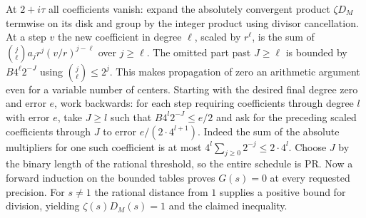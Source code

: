 At $2+i\tau$ all coefficients vanish: expand the absolutely convergent
product $\zeta D_M$ termwise on its disk and group by the integer product
using divisor cancellation. At a step $v$ the new coefficient in
degree $\ell$, scaled by $r^\ell$, is the sum of
$\binom j\ell a_j r^j(v/r)^{j-\ell}$ over $j\ge\ell$.
The omitted part past $J\ge\ell$ is bounded by
$B4^\ell2^{-J}$ using $\binom j\ell\le2^j$. This makes propagation
of zero an arithmetic argument even for a variable number of centers.
Starting with the desired final degree zero and error $e$, work backwards:
for each step requiring coefficients through degree $l$ with error $e$,
take $J\ge l$ such that $B4^l2^{-J}\le e/2$ and ask for the preceding
scaled coefficients through $J$ to error $e/(2\cdot4^{l+1})$.
Indeed the sum of the absolute multipliers for one such coefficient
is at most $4^l\sum_{j\ge0}2^{-j}\le 2\cdot4^l$.
Choose $J$ by the binary length of the rational threshold, so the entire
schedule is PR. Now a forward induction on the bounded tables proves
$G(s)=0$ at every requested precision. For $s\ne1$ the rational
distance from $1$ supplies a positive bound for division, yielding
$\zeta(s)D_M(s)=1$ and the claimed inequality.
